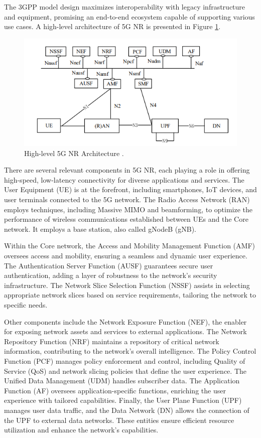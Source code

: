 The 3GPP model design maximizes interoperability with legacy infrastructure and equipment, promising an end-to-end ecosystem capable of supporting various use cases. A high-level architecture of 5G NR is presented in Figure \ref{fig:5G_arch}.

\begin{figure}[H]
    \centering
    \includegraphics[width=0.7\linewidth]{figures/5g NR.png}
    \caption[High-level 5G NR Architecture]{High-level 5G NR Architecture \cite{ETSI_5G_NR}.}
    \label{fig:5G_arch}
\end{figure}

There are several relevant components in 5G NR, each playing a role in offering high-speed, low-latency connectivity for diverse applications and services. The User Equipment (UE) is at the forefront, including smartphones, IoT devices, and user terminals connected to the 5G network. The Radio Access Network (RAN) employs techniques, including Massive MIMO and beamforming, to optimize the performance of wireless communications established between UEs and the Core network. It employs a base station, also called gNodeB (gNB).

Within the Core network, the Access and Mobility Management Function (AMF) oversees access and mobility, ensuring a seamless and dynamic user experience. The Authentication Server Function (AUSF) guarantees secure user authentication, adding a layer of robustness to the network's security infrastructure. The Network Slice Selection Function (NSSF) assists in selecting appropriate network slices based on service requirements, tailoring the network to specific needs.

Other components include the Network Exposure Function (NEF), the enabler for exposing network assets and services to external applications. The Network Repository Function (NRF) maintains a repository of critical network information, contributing to the network's overall intelligence. The Policy Control Function (PCF) manages policy enforcement and control, including Quality of Service (QoS) and network slicing policies that define the user experience. The Unified Data Management (UDM) handles subscriber data. The Application Function (AF) oversees application-specific functions, enriching the user experience with tailored capabilities. Finally, the User Plane Function (UPF) manages user data traffic, and the Data Network (DN) allows the connection of the UPF to external data networks. These entities ensure efficient resource utilization and enhance the network's capabilities.

